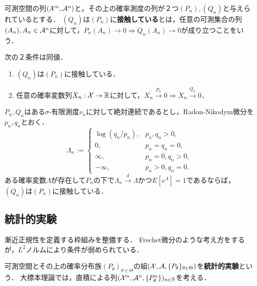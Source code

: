 \documentclass[uplatex,dvipdfmx]{jsreport}
\begin{document}
\begin{definition}[contiguous]
    可測空間の列$(\mathcal{X}^n,\mathcal{A}^n)$と，その上の確率測度の列が２つ$(P_n),(Q_n)$と与えられているとする．
    $(Q_n)$は$(P_n)$に\textbf{接触している}とは，任意の可測集合の列$(A_n),A_n\in\mathcal{A}^n$に対して，$P_n(A_n)\to0\Rightarrow Q_n(A_n)\to0$が成り立つことをいう．
\end{definition}

\begin{lemma}[接触性の特徴付け]
    次の２条件は同値．
    \begin{enumerate}
        \item $(Q_n)$は$(P_n)$に接触している．
        \item 任意の確率変数列$X_n:\mathcal{X}\to\mathbb{R}$に対して，$X_n\xrightarrow{P_n}0\Rightarrow X_n\xrightarrow{Q_n}0$．
    \end{enumerate}
\end{lemma}

\begin{theorem}[接触性の十分条件]
    $P_n,Q_n$はある$\sigma$-有限測度$\nu_n$に対して絶対連続であるとし，Radon-Nikodym微分を$p_n,q_n$とおく．
    \[\Lambda_n:=\begin{cases}
        \log(q_n/p_n),&p_n,q_n>0,\\
        0,&p_n=q_n=0,\\
        \infty,&p_n=0,q_n>0,\\
        -\infty,&p_n>0,q_n=0.
    \end{cases}\]
    ある確率変数$\Lambda$が存在して$P_n$の下で$\Lambda_n\xrightarrow{d}\Lambda$かつ$E[e^\Lambda]=1$であるならば，$(Q_n)$は$(P_n)$に接触している．
\end{theorem}

\subsection{統計的実験}

\begin{tcolorbox}[colframe=ForestGreen, colback=ForestGreen!10!white,breakable,colbacktitle=ForestGreen!40!white,coltitle=black,fonttitle=\bfseries\sffamily,
title=]
    漸近正規性を定義する枠組みを整備する．
    Frechet微分のような考え方をするが，$L^2$ノルムにより条件が弱められている\cite{Ibragimov HasMinskii}．
\end{tcolorbox}

\begin{definition}
    可測空間とその上の確率分布族$(P_\theta)_{\theta\in\Theta}$の組$(\mathcal{X},\mathcal{A},\{P_\theta\}_{\theta\in\Theta})$を\textbf{統計的実験}という．
    大標本理論では，直積による列$(\mathcal{X}^n,\mathcal{A}^n,\{P_\theta^n\})_{n\in\mathbb{N}}$を考える．
\end{definition}
\end{document}
